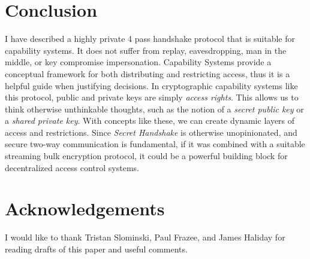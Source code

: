 \documentclass[12pt]{article}
\begin{document}
\section{Conclusion}

I have described a highly private 4 pass handshake protocol
that is suitable for capability systems. It does not suffer
from replay, eavesdropping, man in the middle,
or key compromise impersonation.
Capability Systems provide a conceptual framework for both
distributing and restricting access, thus it is a helpful
guide when justifying decisions.
In cryptographic capability systems like this protocol, public and
private keys are simply \emph{access rights}. This allows us to
think otherwise unthinkable thoughts, such as the notion of a
\emph{secret public key} or a \emph{shared private key}.
With concepts like these, we can create dynamic
layers of access and restrictions. Since \emph{Secret Handshake} is
otherwise unopinionated, and secure two-way communication is fundamental,
if it was combined with a suitable streaming bulk encryption protocol,
it could be a powerful building block for decentralized access
control systems.

\section*{Acknowledgements}

I would like to thank Tristan Slominski, Paul Frazee, and James Haliday
for reading drafts of this paper and useful comments.




\end{document}

